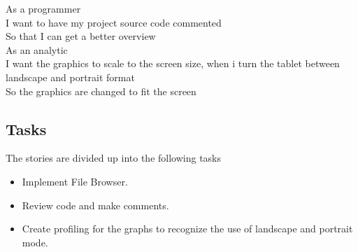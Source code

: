 As a programmer\\
I want to have my project source code commented  \\
So that I can get a better overview \\

As an analytic\\
I want the graphics to scale to the screen size, when i turn the tablet between landscape and portrait format\\
So the graphics are changed to fit the screen\\

\subsection{Tasks} %
\label{sub:Tasks}
The stories are divided up into the following tasks
\begin{itemize}
	\item Implement File Browser.
	\item Review code and make comments.   
	\item Create profiling for the graphs to recognize the use of landscape and portrait mode.
	
\end{itemize}










